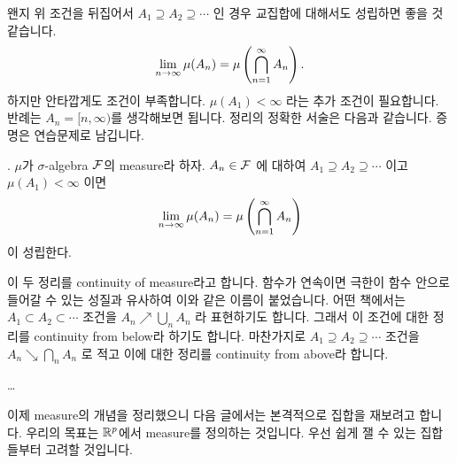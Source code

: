 왠지 위 조건을 뒤집어서 \(A_1 \supseteq A_2 \supseteq \cdots\) 인 경우 교집합에 대해서도 성립하면 좋을 것 같습니다.
\[
    \lim_{n\rightarrow\infty} \mu(A_n) = \mu\left( \bigcap_{n=1}^\infty A_n \right).
\]
하지만 안타깝게도 조건이 부족합니다. \(\mu(A_1) < \infty\) 라는 추가 조건이 필요합니다. 반례는 \(A_n = [n, \infty)\)를 생각해보면 됩니다. 정리의 정확한 서술은 다음과 같습니다. 증명은 연습문제로 남깁니다.

\thm. \(\mu\)가 \(\sigma\)-algebra \(\mathcal{F}\)의 measure라 하자. \(A_n \in \mathcal{F}\) 에 대하여 \(A_1 \supseteq A_2 \supseteq \cdots\) 이고 \(\mu(A_1) < \infty\) 이면
\[
    \lim_{n\rightarrow\infty} \mu(A_n) = \mu\left( \bigcap_{n=1}^\infty A_n \right)
\]
이 성립한다.

이 두 정리를 continuity of measure라고 합니다. 함수가 연속이면 극한이 함수 안으로 들어갈 수 있는 성질과 유사하여 이와 같은 이름이 붙었습니다. 어떤 책에서는 \(A_1 \subset A_2 \subset \cdots\) 조건을 \(A_n \nearrow \bigcup_n A_n\) 라 표현하기도 합니다. 그래서 이 조건에 대한 정리를 continuity from below라 하기도 합니다. 마찬가지로 \(A_1 \supseteq A_2 \supseteq \cdots\) 조건을 \(A_n \searrow \bigcap_n A_n\) 로 적고 이에 대한 정리를 continuity from above라 합니다.

\dots

이제 measure의 개념을 정리했으니 다음 글에서는 본격적으로 집합을 재보려고 합니다. 우리의 목표는 \(\mathbb{R}^p\)에서 measure를 정의하는 것입니다. 우선 쉽게 잴 수 있는 집합들부터 고려할 것입니다.

\pagebreak
